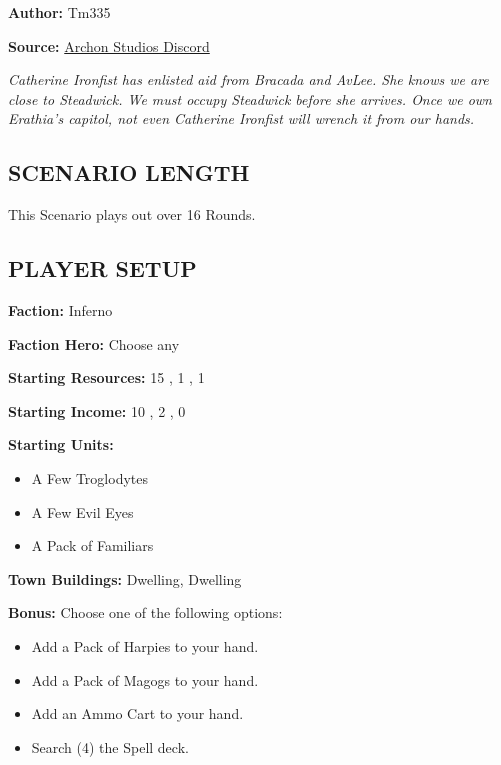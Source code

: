 
\begin{multicols*}{2}

\textbf{Author:} Tm335

\textbf{Source:} \href{https://discord.com/channels/740870068178649108/1246353361456861276/1246353361456861276}{Archon Studios Discord}

\textit{Catherine Ironfist has enlisted aid from Bracada and AvLee.
She knows we are close to Steadwick.
We must occupy Steadwick before she arrives.
Once we own Erathia's capitol, not even Catherine Ironfist will wrench it from our hands.}

\subsection*{\MakeUppercase{Scenario Length}}

This Scenario plays out over 16 Rounds.

\subsection*{\MakeUppercase{Player Setup}}

\textbf{Faction:} Inferno

\textbf{Faction Hero:} Choose any

\textbf{Starting Resources:} 15 , 1 , 1 

\textbf{Starting Income:} 10 , 2 , 0 

\textbf{Starting Units:}

\begin{itemize}
  \item A Few Troglodytes
  \item A Few Evil Eyes
  \item A Pack of Familiars
\end{itemize}

\textbf{Town Buildings:}  Dwelling,  Dwelling

\textbf{Bonus:} Choose one of the following options:
\begin{itemize}
  \item Add a Pack of Harpies to your hand.
  \item Add a Pack of Magogs to your hand.
  \item Add an Ammo Cart to your hand.
  \item Search (4) the Spell deck.
\end{itemize}


\end{multicols*}
